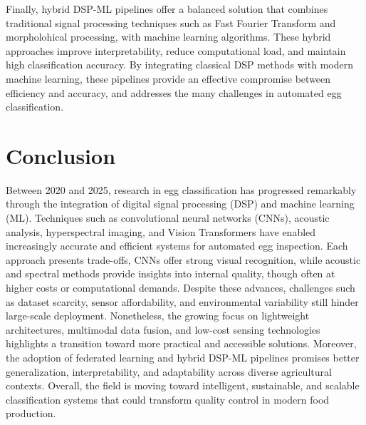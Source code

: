 \documentclass[conference]{IEEEtran}
\begin{document}
	Finally, hybrid DSP-ML pipelines offer a balanced solution that combines traditional signal processing techniques such as Fast Fourier Transform and morpholohical processing, with machine learning algorithms. These hybrid approaches improve interpretability, reduce computational load, and maintain high classification accuracy. By integrating classical DSP methods with modern machine learning, these pipelines provide an effective compromise between efficiency and accuracy, and addresses the many challenges in automated egg classification.
	
	\section{Conclusion}
	Between 2020 and 2025, research in egg classification has progressed remarkably through the integration of digital signal processing (DSP) and machine learning (ML). Techniques such as convolutional neural networks (CNNs), acoustic analysis, hyperspectral imaging, and Vision Transformers have enabled increasingly accurate and efficient systems for automated egg inspection. Each approach presents trade-offs, CNNs offer strong visual recognition, while acoustic and spectral methods provide insights into internal quality, though often at higher costs or computational demands. Despite these advances, challenges such as dataset scarcity, sensor affordability, and environmental variability still hinder large-scale deployment. Nonetheless, the growing focus on lightweight architectures, multimodal data fusion, and low-cost sensing technologies highlights a transition toward more practical and accessible solutions. Moreover, the adoption of federated learning and hybrid DSP-ML pipelines promises better generalization, interpretability, and adaptability across diverse agricultural contexts. Overall, the field is moving toward intelligent, sustainable, and scalable classification systems that could transform quality control in modern food production.
	
\end{document}
